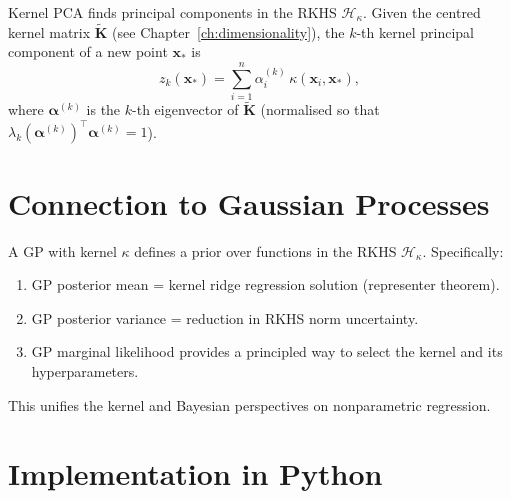 \begin{definition}
Kernel PCA finds principal components in the RKHS $\mathcal{H}_\kappa$. Given the centred kernel matrix $\tilde{\bm{K}}$ (see Chapter~\ref{ch:dimensionality}), the $k$-th kernel principal component of a new point $\bm{x}_*$ is
\[
  z_k(\bm{x}_*) = \sum_{i=1}^n \alpha_i^{(k)}\,\kappa(\bm{x}_i,\bm{x}_*),
\]
where $\bm{\alpha}^{(k)}$ is the $k$-th eigenvector of $\tilde{\bm{K}}$ (normalised so that $\lambda_k(\bm{\alpha}^{(k)})^\top\bm{\alpha}^{(k)}=1$).
\end{definition}

\section{Connection to Gaussian Processes}

\begin{proposition}
A GP with kernel $\kappa$ defines a prior over functions in the RKHS $\mathcal{H}_\kappa$. Specifically:
\begin{enumerate}
  \item GP posterior mean = kernel ridge regression solution (representer theorem).
  \item GP posterior variance = reduction in RKHS norm uncertainty.
  \item GP marginal likelihood provides a principled way to select the kernel and its hyperparameters.
\end{enumerate}
This unifies the kernel and Bayesian perspectives on nonparametric regression.
\end{proposition}

\section{Implementation in Python}

